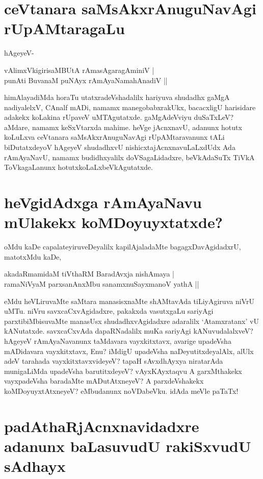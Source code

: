 \section*{ceVtanara saMsAkxrAnuguNavAgi rUpAMtaragaLu} 

hAgeyeV- 

\begin{shloka}
vAlimxVkigirisaMBUtA rAmasAgaragAminiV |\label{174}\\ 
punAti BuvanaM puNAyx rAmAyaNamahAnadiV || 
\end{shloka} 

himAlayadiMda horaTu utatxradeVshadalilx hariyuva shudadhx gaMgA nadiyalelxV, CAnalf mADi, namamx manegobabxrakUkx, bacacxligU harisidare adakekx koLakina rUpaveV uMTAgutatxde. gaMgAdeVviyu duSaTxLeV? aMdare, namamx keSxVtarxda mahime. heVge jAcnxnavU, adanunx hotutx koLuLxva ceVtanara saMsAkxrAnuguNavAgi rUpAMtaravanunx tALi biDutatxdeyoV hAgeyeV shudadhxvU nishicxtajAcnxnavuLaLxdUdx Ada rAmAyaNavU, namamx budidhxyalilx doVSagaLidadxre, beVkAdaSuTx TiVkA ToVkagaLanunx hotutxkoLaLxbeVkAgutatxde. 

\section*{heVgidAdxga rAmAyaNavu mUlakekx koMDoyuyxtatxde?} 

oMdu kaDe capalateyiruveDeyalilx kapilAjaladaMte bagagxDavAgidadxrU, matotxMdu kaDe, 


\begin{shloka}
akadaRmamidaM tiVthaRM BaradAvxja nishAmaya |\label{175}\\ 
ramaNiVyaM parxsanAnxMbu sanamxnuSayxmanoV yathA ||
\end{shloka} 


eMdu heVLiruvaMte saMtara manasisxnaMte shAMtavAda tiLiyAgiruva niVrU uMTu. niVru savxcaCxvAgidadxre, pakakxda vasutxgaLu sariyAgi parxtibiMbisuvaMte manasUsx shudadhxvAgidadxre adaralilx `Atamxratanx' vU kANutatxde. savxcaCxvAda dapaRNadalilx muKa sariyAgi kANuvudalalxveV? hAgeyeV rAmAyaNavanunx taMdavara vayxkitxtavx, avarige upadeVsha mADidavara vayxkitxtavx, Enu? iMdigU upadeVsha naDeyutitxdeyalAlx, alUlx adeV tarahada vayxkitxtavxvideyeV? tapaH sAvxdhAyxya niratarAda munigaLiMda upadeVsha barutitxdeyeV? vAyxKAyxtaqvu A garxMthakekx vayxpadeVsha baradaMte mADutAtxneyeV? A parxdeVshakekx koMDoyuyxtAtxneyeV? eMbudanunx noVDabeVku. idAda meVle paTaTx! 

\section*{padAthaRjAcnxnavidadxre adanunx baLasuvudU rakiSxvudU sAdhayx} 

